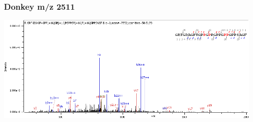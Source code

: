 \documentclass[
]{article}
\begin{document}
\hypertarget{donkey-mz-2511}{%
\subsubsection*{Donkey m/z 2511}\label{donkey-mz-2511}}

\begin{center}\includegraphics{../img/1498-2511} \end{center}

\newpage
\end{document}
